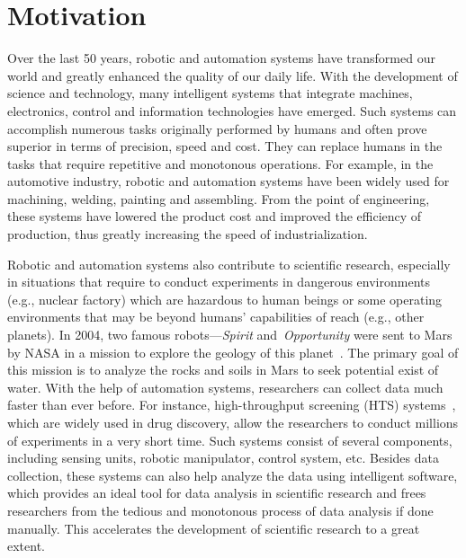 \section{Motivation}

Over the last 50 years, robotic and automation systems have transformed our world and greatly enhanced the quality of our daily life. With the development of science and technology, many intelligent systems that integrate machines, electronics, control and information technologies have emerged. Such systems can accomplish numerous tasks originally performed by humans and often prove superior in terms of precision, speed and cost. They can replace humans in the tasks that require repetitive and monotonous operations. For example, in the automotive industry, robotic and automation systems have been widely used for machining, welding, painting and assembling. From the point of engineering, these systems have lowered the product cost and improved the efficiency of production, thus greatly increasing the speed of industrialization. 

Robotic and automation systems also contribute to scientific research, especially in situations that require to conduct experiments in dangerous environments (e.g., nuclear factory) which are hazardous to human beings or some operating environments that may be beyond humans' capabilities of reach (e.g., other planets). In 2004, two famous robots---\textit{Spirit} and~\textit{Opportunity} were sent to Mars by NASA in a mission to explore the geology of this planet~\cite{Grotzinger:Sci:2014}. The primary goal of this mission is to analyze the rocks and soils in Mars to seek potential exist of water. With the help of automation systems, researchers can collect data much faster than ever before. For instance, high-throughput screening (HTS) systems~\cite{Hertzberg2000}, which are widely used in drug discovery, allow the researchers to conduct millions of experiments in a very short time. Such systems consist of several components, including sensing units, robotic manipulator, control system, etc. Besides data collection, these systems can also help analyze the data using intelligent software, which provides an ideal tool for data analysis in scientific research and frees researchers from the tedious and monotonous process of data analysis if done manually. This accelerates the development of scientific research to a great extent. 

